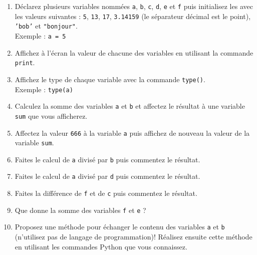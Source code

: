 \begin{enumerate}


\item        Déclarez        plusieurs        variables        nommées
  \texttt{a}, \texttt{b}, \texttt{c}, \texttt{d},      \texttt{e}      et
  \texttt{f} puis initialisez les avec  les valeurs suivantes : \texttt{5}, \texttt{13},
  \texttt{17}, \texttt{3.14159} (le séparateur décimal est le point),
  \texttt{'bob'} et \texttt{"bonjour"}.\\ Exemple : \texttt{a = 5}



\item  Affichez  à l'écran  la  valeur  de  chacune des  variables  en
  utilisant la commande \texttt{print}.

\item  Affichez   le  type  de   chaque  variable  avec   la  commande
  \texttt{type()}.\\ Exemple : \texttt{type(a)}

\item Calculez la somme des variables \texttt{a} et \texttt{b} et affectez
  le  résultat  à  une   variable  \texttt{sum}  que vous afficherez.

\item Affectez la valeur \texttt{666} à la variable \texttt{a} puis affichez de
  nouveau la valeur de la variable \texttt{sum}.

\item  Faites  le calcul  de  \texttt{a}  divisé par  \texttt{b}  puis
  commentez le résultat.

\item  Faites  le calcul  de  \texttt{a}  divisé par  \texttt{d}  puis
  commentez le résultat.

\item  Faites  la  différence  de \texttt{f}  et  de  \texttt{c}  puis
  commentez le résultat.

\item Que donne la somme des variables \texttt{f} et \texttt{e} ?

\item  Proposez une  méthode pour  échanger le  contenu des  variables
  \texttt{a}   et   \texttt{b}   (n'utilisez   pas   de   langage   de
  programmation)!  Réalisez  ensuite  cette méthode  en utilisant  les
  commandes Python que vous connaissez.

\end{enumerate}


